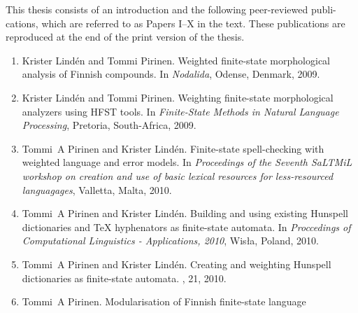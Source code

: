 \documentclass[officiallayout]{unihelcompling}
\begin{document}
This thesis consists of an introduction and the following peer-reviewed publi-
cations, which are referred to as Papers I–X in the text. These publications
are reproduced at the end of the print version of the thesis.


\begin{enumerate}
    \item[\citetalias{pirinen2009weighted}]
        Krister Lindén and Tommi Pirinen.
        \newblock Weighted finite-state morphological analysis of Finnish 
        compounds.
        \newblock In \emph{Nodalida}, Odense, Denmark, 2009.
    \item[\citetalias{pirinen2009weighting}]
        Krister Lindén and Tommi Pirinen.
        \newblock Weighting finite-state morphological analyzers using HFST
        tools.
        \newblock In \emph{Finite-State Methods in Natural Language Processing},
        Pretoria, South-Africa, 2009.
    \item[\citetalias{pirinen2010finitestate}]
        Tommi~A Pirinen and Krister Lindén.
        \newblock Finite-state spell-checking with weighted language and error
        models.
        \newblock In {\em Proceedings of the Seventh SaLTMiL workshop on 
            creation and use of basic lexical resources for less-resourced 
        languagages}, Valletta, Malta, 2010.
    \item[\citetalias{pirinen2010building}]
        Tommi~A Pirinen and Krister Lindén.
        \newblock Building and using existing Hunspell dictionaries and {\TeX }
        hyphenators as finite-state automata.
        \newblock In {\em Proccedings of Computational Linguistics -
            Applications, 2010}, Wis{\l}a, Poland, 2010.
    \item[\citetalias{pirinen2010creating}]
        Tommi~A Pirinen and Krister Lindén.
        \newblock Creating and weighting Hunspell dictionaries as finite-state
        automata.
        , 21, 2010.
    \item[\citetalias{pirinen2011modularisation}]
        Tommi~A Pirinen.
        \newblock Modularisation of Finnish finite-state language 

\end{enumerate}
\end{document}
